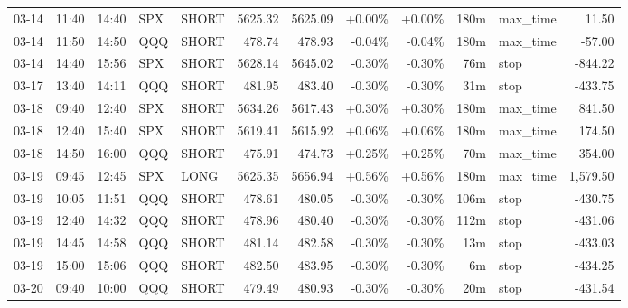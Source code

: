 \documentclass[11pt,a4paper,twoside]{article}
\begin{document}
\begin{center}
\begin{longtable}{>{\color{txtmain}}l l l l l r r r r r >{\color{txtmain}}l r}
03-14 & 11:40 & 14:40 & SPX & SHORT & 5625.32 & 5625.09 & \textcolor{wingreen}{+0.00\%} & \textcolor{wingreen}{+0.00\%} & 180m & max\_time & \textcolor{wingreen}{11.50} \\
03-14 & 11:50 & 14:50 & QQQ & SHORT & 478.74 & 478.93 & \textcolor{lossred}{-0.04\%} & \textcolor{lossred}{-0.04\%} & 180m & max\_time & \textcolor{lossred}{-57.00} \\
03-14 & 14:40 & 15:56 & SPX & SHORT & 5628.14 & 5645.02 & \textcolor{lossred}{-0.30\%} & \textcolor{lossred}{-0.30\%} & 76m & stop & \textcolor{lossred}{-844.22} \\
03-17 & 13:40 & 14:11 & QQQ & SHORT & 481.95 & 483.40 & \textcolor{lossred}{-0.30\%} & \textcolor{lossred}{-0.30\%} & 31m & stop & \textcolor{lossred}{-433.75} \\
03-18 & 09:40 & 12:40 & SPX & SHORT & 5634.26 & 5617.43 & \textcolor{wingreen}{+0.30\%} & \textcolor{wingreen}{+0.30\%} & 180m & max\_time & \textcolor{wingreen}{841.50} \\
03-18 & 12:40 & 15:40 & SPX & SHORT & 5619.41 & 5615.92 & \textcolor{wingreen}{+0.06\%} & \textcolor{wingreen}{+0.06\%} & 180m & max\_time & \textcolor{wingreen}{174.50} \\
03-18 & 14:50 & 16:00 & QQQ & SHORT & 475.91 & 474.73 & \textcolor{wingreen}{+0.25\%} & \textcolor{wingreen}{+0.25\%} & 70m & max\_time & \textcolor{wingreen}{354.00} \\
03-19 & 09:45 & 12:45 & SPX & LONG & 5625.35 & 5656.94 & \textcolor{wingreen}{+0.56\%} & \textcolor{wingreen}{+0.56\%} & 180m & max\_time & \textcolor{wingreen}{1,579.50} \\
03-19 & 10:05 & 11:51 & QQQ & SHORT & 478.61 & 480.05 & \textcolor{lossred}{-0.30\%} & \textcolor{lossred}{-0.30\%} & 106m & stop & \textcolor{lossred}{-430.75} \\
03-19 & 12:40 & 14:32 & QQQ & SHORT & 478.96 & 480.40 & \textcolor{lossred}{-0.30\%} & \textcolor{lossred}{-0.30\%} & 112m & stop & \textcolor{lossred}{-431.06} \\
03-19 & 14:45 & 14:58 & QQQ & SHORT & 481.14 & 482.58 & \textcolor{lossred}{-0.30\%} & \textcolor{lossred}{-0.30\%} & 13m & stop & \textcolor{lossred}{-433.03} \\
03-19 & 15:00 & 15:06 & QQQ & SHORT & 482.50 & 483.95 & \textcolor{lossred}{-0.30\%} & \textcolor{lossred}{-0.30\%} & 6m & stop & \textcolor{lossred}{-434.25} \\
03-20 & 09:40 & 10:00 & QQQ & SHORT & 479.49 & 480.93 & \textcolor{lossred}{-0.30\%} & \textcolor{lossred}{-0.30\%} & 20m & stop & \textcolor{lossred}{-431.54} \\

\end{longtable}
\end{center}
\end{document}
